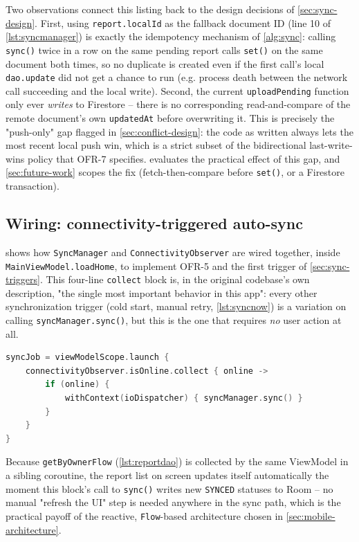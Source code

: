 Two observations connect this listing back to the design decisions of
\cref{sec:sync-design}. First, using \texttt{report.localId} as the
fallback document ID (line 10 of \cref{lst:syncmanager}) is exactly the
idempotency mechanism of \cref{alg:sync}: calling \texttt{sync()} twice in
a row on the same pending report calls \texttt{set()} on the same document
both times, so no duplicate is created even if the first call's local
\texttt{dao.update} did not get a chance to run (e.g. process death
between the network call succeeding and the local write). Second, the
current \texttt{uploadPending} function only ever \emph{writes} to
Firestore -- there is no corresponding read-and-compare of the remote
document's own \texttt{updatedAt} before overwriting it. This is precisely
the "push-only" gap flagged in \cref{sec:conflict-design}: the code as
written always lets the most recent local push win, which is a strict
subset of the bidirectional last-write-wins policy that OFR-7 specifies.
 evaluates the practical effect of this gap, and
\cref{sec:future-work} scopes the fix (fetch-then-compare before
\texttt{set()}, or a Firestore transaction).

\subsection{Wiring: connectivity-triggered auto-sync}

 shows how \texttt{SyncManager} and
\texttt{ConnectivityObserver} are wired together, inside
\texttt{MainViewModel.loadHome}, to implement OFR-5 and the first trigger
of \cref{sec:sync-triggers}. This four-line \texttt{collect} block is, in
the original codebase's own description, "the single most important
behavior in this app": every other synchronization trigger (cold start,
manual retry, \cref{lst:syncnow}) is a variation on calling
\texttt{syncManager.sync()}, but this is the one that requires \emph{no}
user action at all.

\begin{lstlisting}[language=Kotlin, caption={Auto-sync subscription, started once per login (\texttt{viewmodel/MainViewModel.kt}).}, label={lst:autosync}]
syncJob = viewModelScope.launch {
    connectivityObserver.isOnline.collect { online ->
        if (online) {
            withContext(ioDispatcher) { syncManager.sync() }
        }
    }
}
\end{lstlisting}

Because \texttt{getByOwnerFlow} (\cref{lst:reportdao}) is collected by the
same ViewModel in a sibling coroutine, the report list on screen updates
itself automatically the moment this block's call to \texttt{sync()}
writes new \texttt{SYNCED} statuses to Room -- no manual "refresh the UI"
step is needed anywhere in the sync path, which is the practical payoff of
the reactive, \texttt{Flow}-based architecture chosen in
\cref{sec:mobile-architecture}.

